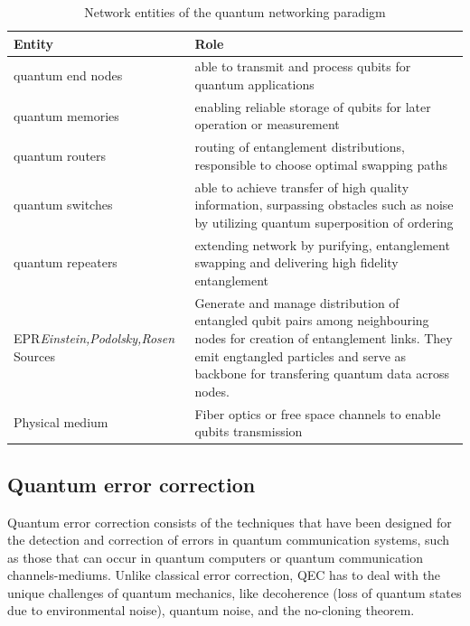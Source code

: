 \documentclass[12pt]{ieeetj}
\begin{document}
		\begin{table}[h!]
		\centering
		\renewcommand{\arraystretch}{0.6}
			\begin{tabular}{|p{4.5cm}|p{8cm}|}
			\hline
			\textbf{Entity} & \textbf{Role} \\ \hline
			quantum end nodes	&  able to transmit and process qubits for quantum applications		\\ \hline
			quantum memories	&  enabling reliable storage of qubits for later operation or measurement 		\\ \hline
			quantum routers		&  routing of entanglement distributions, responsible to choose optimal swapping paths 		\\ \hline
			quantum switches	&  able to achieve transfer of high quality information, surpassing obstacles such as noise by utilizing quantum
				superposition of ordering \\ \hline
			quantum repeaters	& extending network by purifying, entanglement swapping and delivering high fidelity entanglement 		\\ \hline
				EPR\textit{Einstein,Podolsky,Rosen} Sources		&  Generate and manage distribution of entangled qubit pairs among neighbouring nodes for creation of entanglement links. They emit engtangled particles and serve as backbone for transfering quantum data across nodes.		\\ \hline
			Physical medium		&  Fiber optics or free space channels to enable qubits transmission		\\ \hline
		\end{tabular}
		\caption{Network entities of the quantum networking paradigm}
		\label{tab:example}
		\end{table}
		

		\subsection{Quantum error correction}

		Quantum error correction consists of the techniques that have been designed for the
		detection and correction of errors in quantum communication systems, such as those that can occur 
		in quantum computers or quantum communication channels-mediums.
		Unlike classical error correction, QEC has to deal with the unique challenges of quantum mechanics,
		like decoherence (loss of quantum states due to environmental noise), quantum noise, 
		and the no-cloning theorem.
		
\end{document}

